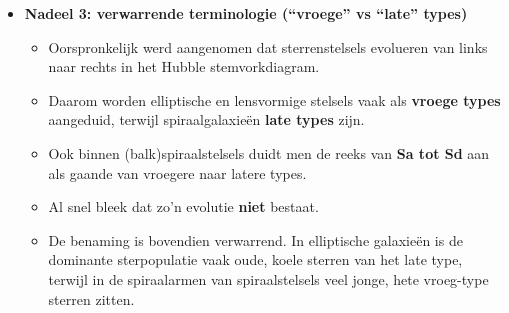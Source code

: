 \documentclass[10pt,a4paper]{article}
\begin{document}
\begin{itemize}
  \item \textbf{Nadeel 3: verwarrende terminologie (``vroege'' vs ``late'' types)}
  \begin{itemize}
    \item Oorspronkelijk werd aangenomen dat sterrenstelsels evolueren van links naar rechts in het Hubble stemvorkdiagram.
    \item Daarom worden elliptische en lensvormige stelsels vaak als \textbf{vroege types} aangeduid, terwijl spiraalgalaxieën \textbf{late types} zijn.
    \item Ook binnen (balk)spiraalstelsels duidt men de reeks van \textbf{Sa tot Sd} aan als gaande van vroegere naar latere types.
    \item Al snel bleek dat zo’n evolutie \textbf{niet} bestaat.
    \item De benaming is bovendien verwarrend. In elliptische galaxieën is de dominante sterpopulatie vaak oude, koele sterren van het late type, terwijl in de spiraalarmen van spiraalstelsels veel jonge, hete vroeg-type sterren zitten.
  \end{itemize}


\end{itemize}
\end{document}
